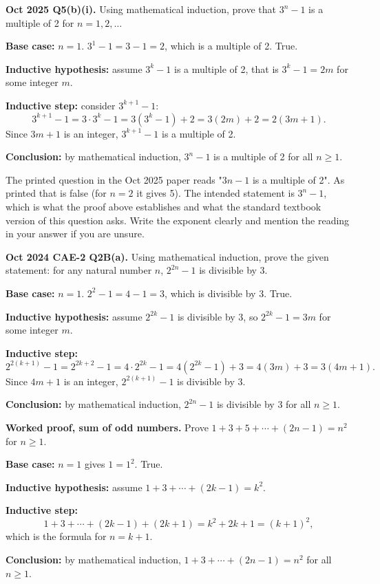 \documentclass[11pt,a4paper]{article}
\begin{document}
\begin{pyqbox}
\textbf{Oct 2025 Q5(b)(i).} Using mathematical induction, prove that $3^{n}-1$ is a multiple of 2 for $n=1,2,\dots$
\end{pyqbox}

\begin{solbox}
\textbf{Base case:} $n=1$. $3^1-1=3-1=2$, which is a multiple of 2. True.

\textbf{Inductive hypothesis:} assume $3^{k}-1$ is a multiple of 2, that is $3^{k}-1=2m$ for some integer $m$.

\textbf{Inductive step:} consider $3^{k+1}-1$:
\[
3^{k+1}-1=3\cdot3^{k}-1=3(3^{k}-1)+2=3(2m)+2=2(3m+1).
\]
Since $3m+1$ is an integer, $3^{k+1}-1$ is a multiple of 2.

\textbf{Conclusion:} by mathematical induction, $3^n-1$ is a multiple of 2 for all $n\ge1$.
\end{solbox}

\begin{dangerbox}
The printed question in the Oct 2025 paper reads "$3n-1$ is a multiple of 2". As printed that is false (for $n=2$ it gives 5). The intended statement is $3^{n}-1$, which is what the proof above establishes and what the standard textbook version of this question asks. Write the exponent clearly and mention the reading in your answer if you are unsure.
\end{dangerbox}

\begin{pyqbox}
\textbf{Oct 2024 CAE-2 Q2B(a).} Using mathematical induction, prove the given statement: for any natural number $n$, $2^{2n}-1$ is divisible by 3.
\end{pyqbox}

\begin{solbox}
\textbf{Base case:} $n=1$. $2^{2}-1=4-1=3$, which is divisible by 3. True.

\textbf{Inductive hypothesis:} assume $2^{2k}-1$ is divisible by 3, so $2^{2k}-1=3m$ for some integer $m$.

\textbf{Inductive step:}
\[
2^{2(k+1)}-1=2^{2k+2}-1=4\cdot2^{2k}-1=4(2^{2k}-1)+3=4(3m)+3=3(4m+1).
\]
Since $4m+1$ is an integer, $2^{2(k+1)}-1$ is divisible by 3.

\textbf{Conclusion:} by mathematical induction, $2^{2n}-1$ is divisible by 3 for all $n\ge1$.
\end{solbox}

\begin{exambox}
\textbf{Worked proof, sum of odd numbers.} Prove $1+3+5+\cdots+(2n-1)=n^2$ for $n\ge1$.

\textbf{Base case:} $n=1$ gives $1=1^2$. True.

\textbf{Inductive hypothesis:} assume $1+3+\cdots+(2k-1)=k^2$.

\textbf{Inductive step:}
\[
1+3+\cdots+(2k-1)+(2k+1)=k^2+2k+1=(k+1)^2,
\]
which is the formula for $n=k+1$.

\textbf{Conclusion:} by mathematical induction, $1+3+\cdots+(2n-1)=n^2$ for all $n\ge1$.
\end{exambox}
\end{document}
